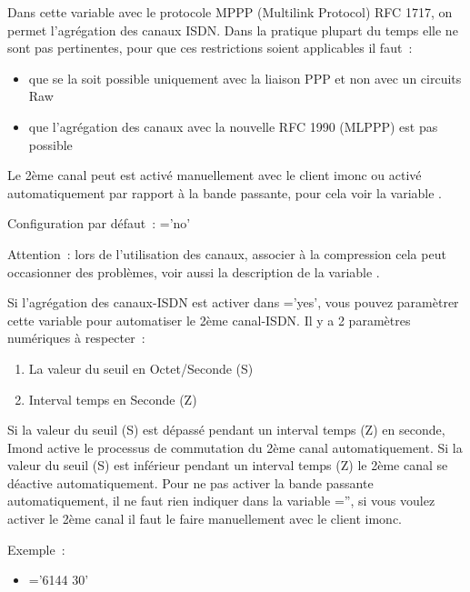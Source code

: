 \begin{description}
  Dans cette variable avec le protocole MPPP (Multilink Protocol) RFC 1717, on
  permet l'agrégation des canaux ISDN. Dans la pratique plupart du temps elle ne
  sont pas pertinentes, pour que ces restrictions soient applicables il faut~:
  \begin{itemize}
  \item que se la soit possible uniquement avec la liaison PPP et non avec un circuits Raw
  \item que l'agrégation des canaux avec la nouvelle RFC 1990 (MLPPP) est pas possible
  \end{itemize}

  Le 2ème canal peut est activé manuellement avec le client imonc ou activé
  automatiquement par rapport à la bande passante, pour cela voir la variable
  .

  Configuration par défaut~: ='no'

  Attention~: lors de l'utilisation des canaux, associer à la compression cela
  peut occasionner des problèmes, voir aussi la description de la variable
  .


  Si l'agrégation des canaux-ISDN est activer dans\linebreak
  ='yes', vous pouvez paramètrer cette variable
  pour automatiser le 2ème canal-ISDN. Il y a 2 paramètres numériques à respecter~:
  \begin{enumerate}
  \item  La valeur du seuil en Octet/Seconde (S)
  \item  Interval temps en Seconde (Z)
  \end{enumerate}

  Si la valeur du seuil (S) est dépassé pendant un interval temps (Z) en seconde,
 Imond active le processus de commutation du 2ème canal automatiquement. Si la
 valeur du seuil (S) est inférieur pendant un interval temps (Z) le 2ème canal se
 déactive automatiquement. Pour ne pas activer la bande passante automatiquement,
 il ne faut rien indiquer dans la variable ='',
 si vous voulez activer le 2ème canal il faut le faire manuellement avec
 le client imonc.

  Exemple~:
  \begin{itemize}
  \item {}='6144 30'


\end{itemize}
\end{description}
